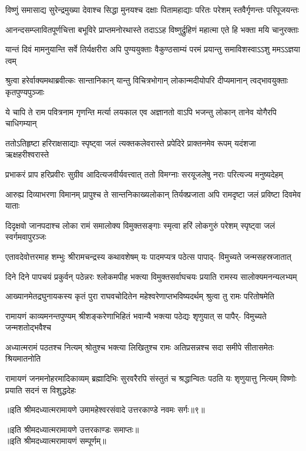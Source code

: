 \fourlineindentedshloka
{विष्णुं समासाद्य सुरेन्द्रमुख्या}
{देवाश्च सिद्धा मुनयश्च दक्षाः}
{पितामहाद्याः परितः परेशम्}
{स्तवैर्गृणन्तः परिपूजयन्तः} %

\fourlineindentedshloka
{आनन्दसम्प्लावितपूर्णचित्ता}
{बभूविरे प्राप्तमनोरथास्ते}
{तदाऽऽह विष्णुर्द्रुहिणं महात्मा}
{एते हि भक्ता मयि चानुरक्ताः} %

\fourlineindentedshloka
{यान्तं दिवं मामनुयान्ति सर्वे}
{तिर्यक्षरीरा अपि पुण्ययुक्ताः}
{वैकुण्ठसाम्यं परमं प्रयान्तु}
{समाविशस्वाऽऽशु ममऽऽज्ञया त्वम्} %

\fourlineindentedshloka
{श्रुत्वा हरेर्वाक्यमथाब्रवीत्कः}
{सान्तानिकान् यान्तु विचित्रभोगान्}
{लोकान्मदीयोपरि दीप्यमानान्}
{त्वद्भावयुक्ताः कृतपुण्यपुञ्जाः} %

\fourlineindentedshloka
{ये चापि ते राम पवित्रनाम}
{गृणन्ति मर्त्या लयकाल एव}
{अज्ञानतो वाऽपि भजन्तु लोकान्}
{तानेव योगैरपि चाधिगम्यान्} %

\fourlineindentedshloka
{ततोऽतिहृष्टा हरिराक्षसाद्याः}
{स्पृष्ट्वा जलं त्यक्तकलेवरास्ते}
{प्रपेदिरे प्राक्तनमेव रूपम्}
{यदंशजा ऋक्षहरीश्वरास्ते} %

\fourlineindentedshloka
{प्रभाकरं प्राप हरिप्रवीरः}
{सुग्रीव आदित्यजवीर्यवत्त्वात्}
{ततो विमग्नाः सरयूजलेषु}
{नराः परित्यज्य मनुष्यदेहम्} %

\fourlineindentedshloka
{आरुह्य दिव्याभरणा विमानम्}
{प्रापुश्च ते सान्तनिकाख्यलोकान्}
{तिर्यक्प्रजाता अपि रामदृष्टा}
{जलं प्रविष्टा दिवमेव याताः} %

\fourlineindentedshloka
{दिदृक्षवो जानपदाश्च लोका}
{रामं समालोक्य विमुक्तसङ्गाः}
{स्मृत्वा हरिं लोकगुरुं परेशम्}
{स्पृष्ट्वा जलं स्वर्गमवापुरञ्जः} %

\fourlineindentedshloka
{एतावदेवोत्तरमाह शम्भुः}
{श्रीरामचन्द्रस्य कथावशेषम्}
{यः पादमप्यत्र पठेत्स पापाद्-}
{विमुच्यते जन्मसहस्रजातात्} %

\fourlineindentedshloka
{दिने दिने पापचयं प्रकुर्वन्}
{पठेन्नरः श्लोकमपीह भक्त्या}
{विमुक्तसर्वाघचयः प्रयाति}
{रामस्य सालोक्यमनन्यलभ्यम्} %

\fourlineindentedshloka
{आख्यानमेतद्रघुनायकस्य}
{कृतं पुरा राघवचोदितेन}
{महेश्वरेणाप्तभविष्यदर्थम्}
{श्रुत्वा तु रामः परितोषमेति} %

\fourlineindentedshloka
{रामायणं काव्यमनन्तपुण्यम्}
{श्रीशङ्करेणाभिहितं भवान्यै}
{भक्त्या पठेद्यः शृणुयात् स पापैर्-}
{विमुच्यते जन्मशतोद्भवैश्च} %

\fourlineindentedshloka
{अध्यात्मरामं पठतश्च नित्यम्}
{श्रोतुश्च भक्त्या लिखितुश्च रामः}
{अतिप्रसन्नश्च सदा समीपे}
{सीतासमेतः श्रियमातनोति} %

\fourlineindentedshloka
{रामायणं जनमनोहरमादिकाव्यम्}
{ब्रह्मादिभिः सुरवरैरपि संस्तुतं च}
{श्रद्धान्वितः पठति यः शृणुयात्तु नित्यम्}
{विष्णोः प्रयाति सदनं स विशुद्धदेहः} %

{॥इति श्रीमदध्यात्मरामायणे उमामहेश्वरसंवादे
उत्तरकाण्डे नवमः सर्गः॥९॥}

॥इति श्रीमदध्यात्मरामायणे उत्तरकाण्डः समाप्तः॥\\
॥इति श्रीमदध्यात्मरामायणं सम्पूर्णम्॥